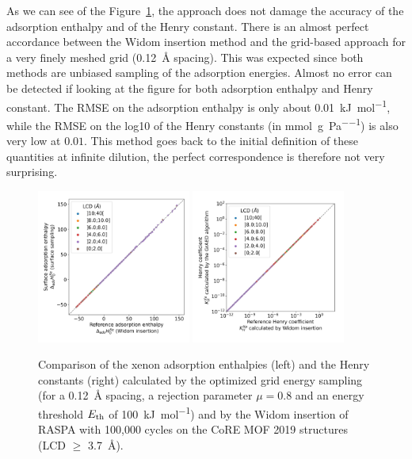 \documentclass[main]{subfiles}
\begin{document}
As we can see of the Figure~\ref{fgr:grid_widom}, the approach does not damage the accuracy of the adsorption enthalpy and of the Henry constant. There is an almost perfect accordance between the Widom insertion method and the grid-based approach for a very finely meshed grid (\SI{0.12}{\angstrom} spacing). This was expected since both methods are unbiased sampling of the adsorption energies. Almost no error can be detected if looking at the figure for both adsorption enthalpy and Henry constant. The RMSE on the adsorption enthalpy is only about \SI{0.01}{\kilo\joule\per\mole}, while the RMSE on the log10 of the Henry constants (in \si{\milli\mole\per\gram\per\pascal}) is also very low at $0.01$. This method goes back to the initial definition of these quantities at infinite dilution, the perfect correspondence is therefore not very surprising. 

\begin{figure}[ht]
  \centering
    \includegraphics[width=0.45\textwidth]{figures/3-fastsim/H_Xe_widom_vs_H_Xe_grid_overview.jpg}
    \includegraphics[width=0.45\textwidth]{figures/3-fastsim/K_Xe_widom_vs_K_Xe_grid_overview.jpg}
    \caption{Comparison of the xenon adsorption enthalpies (left) and the Henry constants (right) calculated by the optimized grid energy sampling (for a \SI{0.12}{\angstrom} spacing, a rejection parameter $\mu=0.8$ and an energy threshold $E_{\text{th}}$ of \SI{100}{\kilo\joule\per\mole}) and by the Widom insertion of RASPA with 100,000 cycles on the CoRE MOF 2019 structures (LCD $\geq$ \SI{3.7}{\angstrom}). }\label{fgr:grid_widom}
\end{figure}
\end{document}
